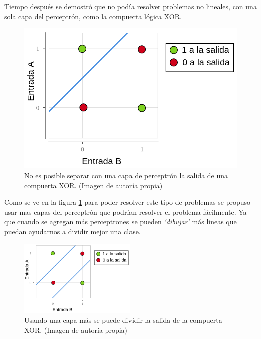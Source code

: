 \par Tiempo después se demostró que no podía resolver problemas no lineales, con una sola capa del perceptrón, como la compuerta lógica XOR.
\begin{figure}[H]
	\begin{minipage}{0.5\textwidth}
		
	\end{minipage}%
	\begin{minipage}{0.5\textwidth}
		\includegraphics[width=\textwidth]{imagenes/diagramaXor.png}
	\end{minipage}
	\caption{No es posible separar con una capa de perceptrón la salida de una compuerta XOR. (Imagen de autoría propia)}
	\label{fig:xor}
\end{figure}


\par Como se ve en la figura \ref{fig:xor} para poder resolver este tipo de problemas se propuso usar mas capas del perceptrón que podrían resolver el problema fácilmente. Ya que cuando se agregan más perceptrones se pueden \textit{`dibujar'} más lineas que puedan ayudarnos a dividir mejor una clase.

\begin{figure}[H]
	\centering
	\includegraphics[width=0.5\textwidth]{imagenes/diagramaXor2.png}
	\caption{Usando una capa más se puede dividir la salida de la compuerta XOR. (Imagen de autoría propia)}
	\label{fig:xor2}
\end{figure}

